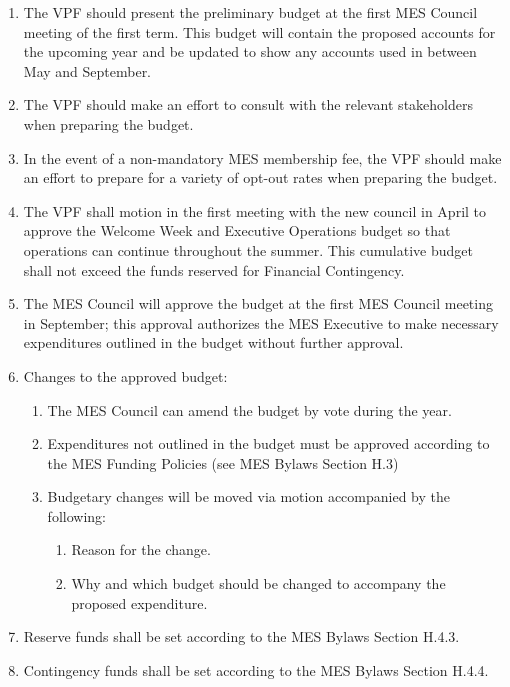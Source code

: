 \begin{enumerate}
 \item
  The VPF should present the preliminary budget at the first MES Council
  meeting of the first term. This budget will contain the proposed
  accounts for the upcoming year and be updated to show any accounts
  used in between May and September.
 \item
  The VPF should make an effort to consult with the relevant
  stakeholders when preparing the budget.
 \item
  In the event of a non-mandatory MES membership fee, the VPF should
  make an effort to prepare for a variety of opt-out rates when
  preparing the budget.
 \item
  The VPF shall motion in the first meeting with the new council in
  April to approve the Welcome Week and Executive Operations budget so
  that operations can continue throughout the summer. This cumulative
  budget shall not exceed the funds reserved for Financial Contingency.
 \item
  The MES Council will approve the budget at the first MES Council
  meeting in September; this approval authorizes the MES Executive to
  make necessary expenditures outlined in the budget without further
  approval.
 \item
  Changes to the approved budget:

  \begin{enumerate}
   \item
    The MES Council can amend the budget by vote during the year.
   \item
    Expenditures not outlined in the budget must be approved according
    to the MES Funding Policies (see MES Bylaws Section H.3)
   \item
    Budgetary changes will be moved via motion accompanied by the
    following:

    \begin{enumerate}
     \item
      Reason for the change.
     \item
      Why and which budget should be changed to accompany the proposed
      expenditure.
    \end{enumerate}
  \end{enumerate}
 \item
  Reserve funds shall be set according to the MES Bylaws Section H.4.3.
 \item
  Contingency funds shall be set according to the MES Bylaws Section
  H.4.4.

\end{enumerate}

